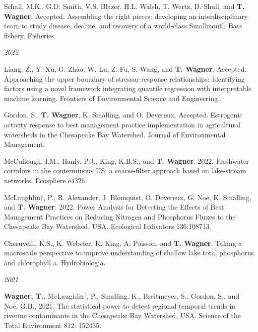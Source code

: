 \documentclass[10pt]{article}
\begin{document}
\begin{flushleft}
\begin{etaremune}[start=129]
\item Schall, M.K., G.D. Smith, V.S. Blazer, H.L. Walsh, T. Wertz, D. Shull, and \textbf{T. Wagner}. Accepted. Assembling the right pieces: developing an interdisciplinary team to study disease, decline, and recovery of a world-class Smallmouth Bass fishery. Fisheries.

\end{etaremune}

\vspace{5pt}
\emph{2022}
\begin{etaremune}[start=122]

\item Liang, Z., Y. Xu, G. Zhao, W. Lu, Z. Fu, S. Wang, and \textbf{T. Wagner}. Accepted. Approaching the upper boundary of stressor-response relationships: Identifying factors using a novel framework integrating quantile regression with interpretable machine learning. Frontiers of Environmental Science and Engineering.

\item Gordon, S., \textbf{T. Wagner}, K. Smalling, and O. Devereux. Accepted. Estrogenic activity response to best management practice implementation in agricultural watersheds in the Chesapeake Bay Watershed. Journal of Environmental Management.

\item McCullough, I.M., Hanly, P.J., King, K.B.S., and \textbf{T. Wagner}. 2022. Freshwater corridors in the conterminous US: a coarse-filter approach based on lake-stream networks. Ecosphere e4326.

\item McLaughlin$\dagger$, P., R. Alexander, J. Blomquist, O. Devereux, G. Noe, K. Smalling, and \textbf{T. Wagner}. 2022. Power Analysis for Detecting the Effects of Best Management Practices on Reducing Nitrogen and Phosphorus Fluxes to the Chesapeake Bay Watershed, USA. Ecological Indicators 136:108713.

\item Cheruvelil, K.S., K. Webster, K. King, A. Poisson, and \textbf{T. Wagner}. Taking a macroscale perspective to improve understanding of shallow lake total phosphorus and chlorophyll a. Hydrobiologia.

\end{etaremune}
\vspace{5pt}
\emph{2021}
\begin{etaremune}[start=117]

\item \textbf{Wagner, T.}, McLaughlin$^\dagger$, P., Smalling, K., Breitmeyer, S., Gordon, S., and Noe, G.B., 2021. The statistical power to detect regional temporal trends in riverine contaminants in the Chesapeake Bay Watershed, USA. Science of the Total Environment 812: 152435.


\end{etaremune}
\end{flushleft}
\end{document}
